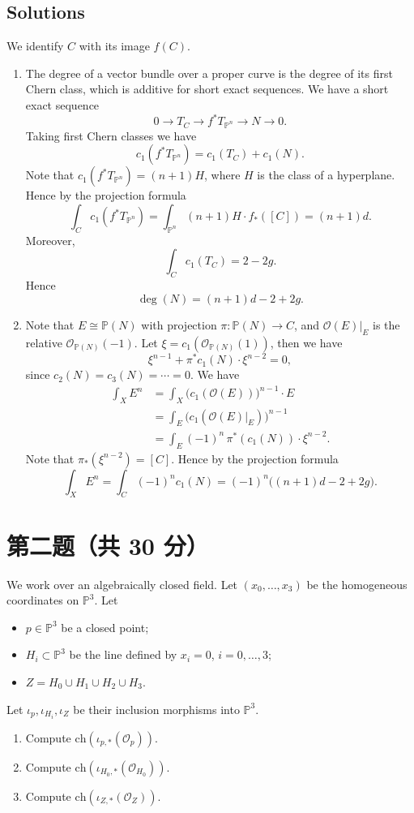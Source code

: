 \subsection*{Solutions}
We identify $C$ with its image $f(C)$.
\begin{enumerate}[label=\arabic*.]
\item The degree of a vector bundle over a proper curve is the degree of its first Chern class,
which is additive for short exact sequences. We have a short exact sequence
\[
0 \to T_C \to f^*T_{\mathbb{P}^n} \to N \to 0.
\]
Taking first Chern classes we have
\[
c_1(f^*T_{\mathbb{P}^n}) = c_1(T_C) + c_1(N).
\]
Note that $c_1(f^*T_{\mathbb{P}^n})=(n+1)H$, where $H$ is the class of a hyperplane.
Hence by the projection formula
\[
\int_C c_1(f^*T_{\mathbb{P}^n})
= \int_{\mathbb{P}^n} (n+1)H \cdot f_*([C]) = (n+1)d.
\]
Moreover,
\[
\int_C c_1(T_C)=2-2g.
\]
Hence
\[
\deg(N)=(n+1)d-2+2g.
\]

\item Note that $E \cong \mathbb{P}(N)$ with projection $\pi:\mathbb{P}(N)\to C$, and
$\mathcal{O}(E)|_E$ is the relative $\mathcal{O}_{\mathbb{P}(N)}(-1)$.
Let $\xi=c_1(\mathcal{O}_{\mathbb{P}(N)}(1))$, then we have
\[
\xi^{n-1} + \pi^*c_1(N)\cdot \xi^{n-2}=0,
\]
since $c_2(N)=c_3(N)=\cdots=0$. We have
\begin{align*}
\int_X E^n
&=\int_X \bigl(c_1(\mathcal{O}(E))\bigr)^{n-1}\cdot E \\
&=\int_E \bigl(c_1(\mathcal{O}(E)|_E)\bigr)^{n-1} \\
&=\int_E (-1)^n\, \pi^*(c_1(N))\cdot \xi^{n-2}.
\end{align*}
Note that $\pi_*(\xi^{n-2})=[C]$. Hence by the projection formula
\[
\int_X E^n = \int_C (-1)^n c_1(N) = (-1)^n\bigl((n+1)d-2+2g\bigr).
\]
\end{enumerate}

\bigskip

\section*{第二题（共 30 分）}
We work over an algebraically closed field. Let $(x_0,\ldots,x_3)$ be the homogeneous coordinates on
$\mathbb{P}^3$. Let
\begin{itemize}
\item $p\in\mathbb{P}^3$ be a closed point;
\item $H_i\subset\mathbb{P}^3$ be the line defined by $x_i=0$, $i=0,\ldots,3$;
\item $Z=H_0\cup H_1\cup H_2\cup H_3$.
\end{itemize}
Let $\iota_p,\iota_{H_i},\iota_Z$ be their inclusion morphisms into $\mathbb{P}^3$.
\begin{enumerate}[label=\arabic*.]
\item Compute $\mathrm{ch}(\iota_{p,*}(\mathcal{O}_p))$.
\item Compute $\mathrm{ch}(\iota_{H_0,*}(\mathcal{O}_{H_0}))$.
\item Compute $\mathrm{ch}(\iota_{Z,*}(\mathcal{O}_Z))$.
\end{enumerate}

